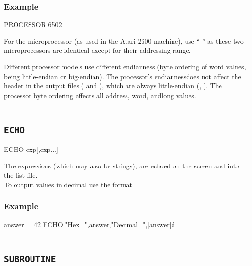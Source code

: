 \subsubsection{Example}
\begin{code}
  PROCESSOR 6502
\end{code}	

For the  microprocessor (as used in the Atari 2600 machine), use `` '' as these two microprocessors are identical except for their addressing range.
	
Different processor	models use different endianness (byte ordering of word values, being little-endian or big-endian). The processor's endiannessdoes not affect the header in the output files ( and ), which are always little-endian (, ).  The processor byte ordering affects all address, word, andlong values.\\

\hrule

\subsection{\texttt{ECHO}}
\label{pseudoop:echo}

\begin{usage}
  ECHO exp[,exp...]
\end{usage}

The expressions (which may also be strings), are echoed on the
screen and into the list file.\\

To output values in decimal use the format 

\subsubsection{Example}

\begin{code}
answer = 42
  ECHO "Hex=",answer,"Decimal=",[answer]d
\end{code}


\hrule

\subsection{\texttt{SUBROUTINE}}
\label{pseudoop:subroutine}

